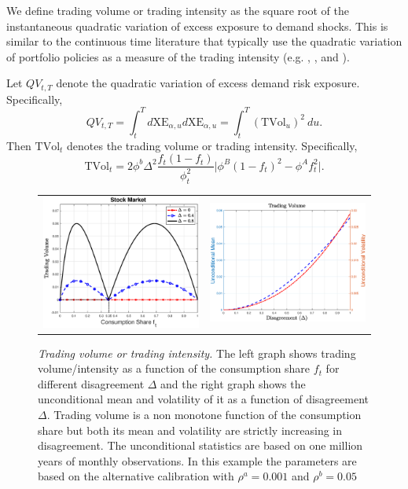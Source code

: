 We define trading volume or trading intensity as the square root of the instantaneous quadratic variation of excess exposure to demand shocks. This is similar to the continuous time literature that typically use the quadratic variation of portfolio policies as a measure of the trading intensity (e.g. \cite{grossman-zhou:96}, \cite{longstaff-wang:12}, and \cite{EhlingHeyerdahlLarsen2016}).  

\begin{prop}\label{prop:TradingVolume}
 Let $QV_{t,T}$ denote the quadratic variation of excess demand risk exposure. Specifically,
 \begin{equation}
  QV_{t,T} = \int_t^{T} d\text{XE}_{\alpha,u} d\text{XE}_{\alpha,u} = \int_t^{T} \left(\text{TVol}_u\right)^2 \: du.
 \end{equation}
 Then $\text{TVol}_t$ denotes the trading volume or trading intensity. Specifically, 
\begin{equation}\label{eq:TVol}
	\text{TVol}_t = 2\phi^b \Delta^2  \frac{f_t (1-f_t) }{\phi_t^2} \lvert \phi^B \left(1-f_t\right)^2 - \phi^A f_t^2   \rvert.
\end{equation}
\end{prop}

\begin{figure}[H] 
\centering
\begin{tabular}{cc}
\includegraphics[width=.4\textwidth]{figures/TradingVolume2f.eps} &
\includegraphics[width=.4\textwidth]{figures/TradingVolume2DELmeanvol.eps} 
\end{tabular}
\caption{\emph{Trading volume or trading intensity.} \footnotesize{The left graph shows trading volume/intensity as a function of the consumption share $f_t$ for different disagreement $\Delta$ and the right graph shows the unconditional mean and volatility of it as a function of disagreement $\Delta$. Trading volume is a non monotone function of the consumption share but both its mean and volatility are strictly increasing in disagreement. The unconditional statistics are based on one million years of monthly observations. In this example the parameters are based on the alternative calibration with $\rho^a = 0.001$ and $\rho^b = 0.05$}}   \label{fig:tradingf} 
\end{figure}

